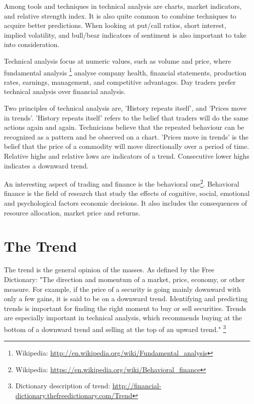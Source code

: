 Among tools and techniques in technical analysis are charts, market indicators,
and relative strength index. It is also quite common to combine techniques to
acquire better predictions. When looking at put/call ratios, short interest,
implied volatility, and bull/bear indicators of sentiment is also important to take into consideration. 

Technical analysis focus at numeric values, such as volume and price, where fundamental analysis \footnote{Wikipedia:
\url{http://en.wikipedia.org/wiki/Fundamental_analysis}} analyse company health,
financial statements, production rates, earnings, management, and competitive
advantages. Day traders prefer technical analysis over
financial analysis.   

Two principles of technical analysis are, 'History repeats itself', and
'Prices move in trends'. 'History repeats itself' refers to the belief that
traders will do the same actions again and again. Technicians believe that the
repeated behaviour can be recognized as a pattern and be observed on a chart.
'Prices move in trends' is the belief that the price of a commodity will move
directionally over a period of time. Relative highs and relative lows are
indicators of a trend. Consecutive lower highs indicates a downward trend.  

An interesting aspect of trading and finance is the behavioral
one\footnote{Wikipedia:
\url{https://en.wikipedia.org/wiki/Behavioral_finance}}.
Behavioral finance is the field of research that study the effects of
cognitive, social, emotional and psychological factors economic decisions. It
also includes the consequences of resource allocation, market price and
returns. 
%

\section{The Trend}\label{previous_work:trends}
The trend is the general opinion of the masses. As defined by the Free
Dictionary:  
"The direction and momentum of a market, price, economy, or other measure. For
example, if the price of a security is going mainly downward with only a few
gains, it is said to be on a downward trend. Identifying and
predicting trends is important for finding the right moment to buy or sell
securities. Trends are especially important in technical analysis, which
recommends buying at the bottom of a downward trend and selling at the top of an
upward trend."
\footnote{Dictionary description of trend: \url{http://financial-dictionary.thefreedictionary.com/Trend}}

